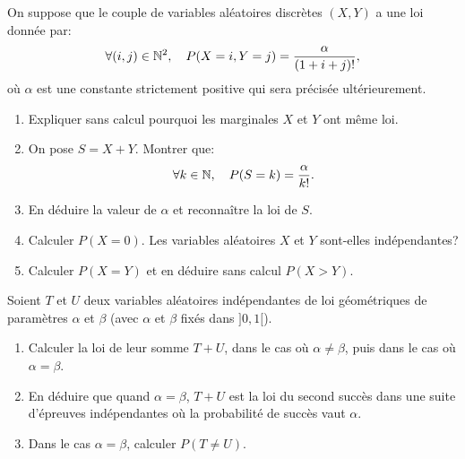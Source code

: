 \documentclass[a4paper,12pt,reqno]{amsart}
\begin{document}
\begin{exo}

  On suppose que le couple de variables aléatoires discrètes $(X,Y)$ a une loi donnée par:
    $$
      \forall (i,j)\in\mathbb{N}^{2},\quad P(X=i, Y=j)=\frac{\alpha}{(1+i+j)!},
    $$
  où $\alpha$ est une constante strictement positive qui sera précisée ultérieurement.
  \begin{enumerate}
    \item Expliquer sans  calcul pourquoi les marginales $X$ et $Y$ ont même loi.
    \item On pose $S=X+Y$. Montrer que:
      $$
        \forall k\in\mathbb{N},\quad P(S=k)=\frac{\alpha}{k!}.
      $$
    \item En déduire la valeur de $\alpha$ et reconnaître la loi de $S$.
    \item Calculer $P(X=0)$. Les variables aléatoires $X$ et $Y$ sont-elles indépendantes?
    \item Calculer $P(X=Y)$ et en déduire sans calcul $P(X>Y)$.
  \end{enumerate}

\end{exo}

\begin{exo}

  Soient $T$ et $U$  deux variables aléatoires indépendantes de loi géométriques de paramètres $\alpha$ et $\beta$ (avec $\alpha$ et $\beta$ fixés dans $]0,1[$).
  \begin{enumerate}
    \item Calculer la loi de leur somme $T+U$, dans le cas où $\alpha\neq\beta$, puis dans le cas où $\alpha=\beta$.
    \item En déduire que quand $\alpha=\beta$, $T+U$ est la loi du second succès dans une suite d'épreuves indépendantes où la probabilité de succès vaut $\alpha$.
    \item Dans le cas $\alpha=\beta$, calculer $P(T \neq U)$.
  \end{enumerate}

\end{exo}
\end{document}
